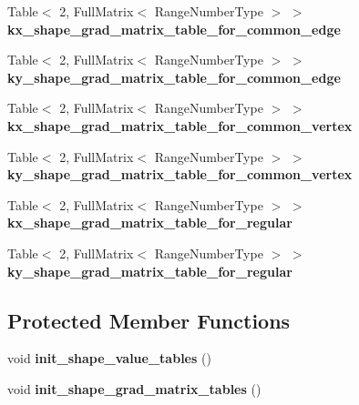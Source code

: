 \begin{DoxyCompactItemize}
Table$<$ 2, Full\+Matrix$<$ Range\+Number\+Type $>$ $>$ {\bfseries kx\+\_\+shape\+\_\+grad\+\_\+matrix\+\_\+table\+\_\+for\+\_\+common\+\_\+edge}
\item 
\mbox{\label{classLaplaceBEM_1_1BEMValues_ae30c6f5629a6aebd6cf2445f7dc7357f}} 
Table$<$ 2, Full\+Matrix$<$ Range\+Number\+Type $>$ $>$ {\bfseries ky\+\_\+shape\+\_\+grad\+\_\+matrix\+\_\+table\+\_\+for\+\_\+common\+\_\+edge}
\item 
\mbox{\label{classLaplaceBEM_1_1BEMValues_af272687194bb9836a8e54ae25e2ef538}} 
Table$<$ 2, Full\+Matrix$<$ Range\+Number\+Type $>$ $>$ {\bfseries kx\+\_\+shape\+\_\+grad\+\_\+matrix\+\_\+table\+\_\+for\+\_\+common\+\_\+vertex}
\item 
\mbox{\label{classLaplaceBEM_1_1BEMValues_a86ef4b138039af89dc71569bbf18a711}} 
Table$<$ 2, Full\+Matrix$<$ Range\+Number\+Type $>$ $>$ {\bfseries ky\+\_\+shape\+\_\+grad\+\_\+matrix\+\_\+table\+\_\+for\+\_\+common\+\_\+vertex}
\item 
\mbox{\label{classLaplaceBEM_1_1BEMValues_a34933185cecf9d4cea46597642f8d802}} 
Table$<$ 2, Full\+Matrix$<$ Range\+Number\+Type $>$ $>$ {\bfseries kx\+\_\+shape\+\_\+grad\+\_\+matrix\+\_\+table\+\_\+for\+\_\+regular}
\item 
\mbox{\label{classLaplaceBEM_1_1BEMValues_ad6938f3aad2ab93ed61fc48de8e4de65}} 
Table$<$ 2, Full\+Matrix$<$ Range\+Number\+Type $>$ $>$ {\bfseries ky\+\_\+shape\+\_\+grad\+\_\+matrix\+\_\+table\+\_\+for\+\_\+regular}
\end{DoxyCompactItemize}
\subsection*{Protected Member Functions}
\begin{DoxyCompactItemize}
\item 
\mbox{\label{classLaplaceBEM_1_1BEMValues_a71328aee0f80bcea63897444b086de99}} 
void {\bfseries init\+\_\+shape\+\_\+value\+\_\+tables} ()
\item 
\mbox{\label{classLaplaceBEM_1_1BEMValues_a5646d3caf1ede82b5dca1f82be893dd4}} 
void {\bfseries init\+\_\+shape\+\_\+grad\+\_\+matrix\+\_\+tables} ()
\end{DoxyCompactItemize}


